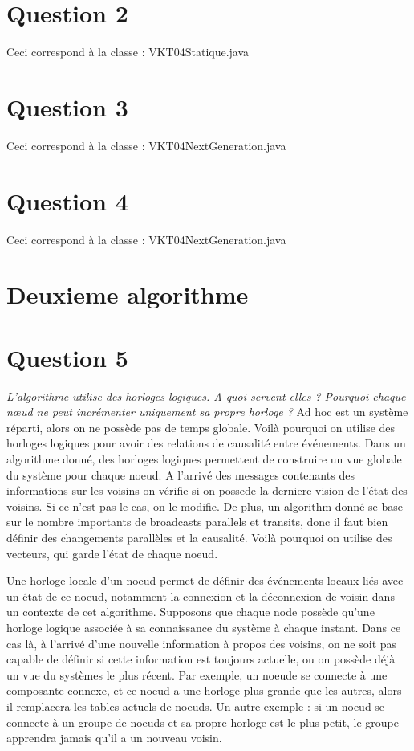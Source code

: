 \documentclass[11pt,a4paper,sans]{report}
\begin{document}
	\section{Question 2}
	Ceci correspond à la classe : VKT04Statique.java

	\section{Question 3}
	Ceci correspond à la classe : VKT04NextGeneration.java

	\section{Question 4}
	Ceci correspond à la classe : VKT04NextGeneration.java

	\section*{Deuxieme algorithme}

	\section{Question 5}
	\textit{L’algorithme utilise des horloges logiques. A quoi servent-elles ?  Pourquoi chaque nœud ne peut incrémenter uniquement sa propre horloge ?}
	Ad hoc est un système réparti, alors on ne possède pas de temps globale. Voilà pourquoi on utilise des horloges logiques pour avoir des relations de causalité entre événements. Dans un algorithme donné, des horloges logiques permettent de construire un vue globale du système pour chaque noeud. A l’arrivé des messages contenants des informations sur les voisins on vérifie si on possede la derniere vision de l’état des voisins. Si ce n’est pas le cas, on le modifie. De plus, un algorithm donné se base sur le nombre importants de broadcasts parallels et transits, donc il faut bien définir des changements parallèles et la causalité. Voilà pourquoi on utilise des vecteurs, qui garde l’état de chaque noeud.

	Une horloge locale d’un noeud permet de définir des événements locaux liés avec un état de ce noeud, notamment la connexion et la déconnexion de voisin dans un contexte de cet algorithme. Supposons que chaque node possède qu’une horloge logique associée à sa connaissance du système à chaque instant. Dans ce cas là, à l’arrivé d’une nouvelle information à propos des voisins, on ne soit pas capable de définir si cette information est toujours actuelle, ou on possède déjà un vue du systèmes le plus récent. Par exemple, un noeude se connecte à une composante connexe, et ce noeud a une horloge plus grande que les autres, alors il remplacera les tables actuels de noeuds. Un autre exemple :  si un noeud se connecte à un groupe de noeuds et sa propre horloge est le plus petit, le groupe apprendra jamais qu’il a un nouveau voisin.
\end{document}
